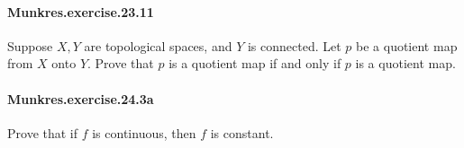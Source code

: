 \documentclass{article}
\begin{document}






\paragraph{Munkres.exercise.23.11} Suppose $X, Y$ are topological spaces, and $Y$ is connected. Let $p$ be a quotient map from $X$ onto $Y$. Prove that $p$ is a quotient map if and only if $p$ is a quotient map.

\paragraph{Munkres.exercise.24.3a} Prove that if $f$ is continuous, then $f$ is constant.
\end{document}
